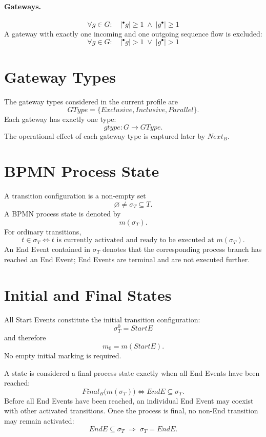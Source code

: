 \documentclass[11pt,a4paper]{article}
\newcommand{\StartE}{\mathit{StartE}}
\newcommand{\EndE}{\mathit{EndE}}
\newcommand{\NextB}{\mathit{Next}_{B}}
\newcommand{\GType}{\mathit{GType}}
\newcommand{\gtype}{\mathit{gtype}}
\begin{document}
\paragraph{Gateways.}
\[
\boxed{
\forall g\in G:\quad
|{}^{\bullet}g|\geq 1
\;\land\;
|g^{\bullet}|\geq 1
}
\tag{WF-G1}
\]
A gateway with exactly one incoming and one outgoing sequence flow is excluded:
\[
\boxed{
\forall g\in G:\quad
|{}^{\bullet}g|>1
\;\lor\;
|g^{\bullet}|>1
}
\tag{WF-G2}
\]

\section{Gateway Types}

The gateway types considered in the current profile are
\[
\boxed{
\GType=\{\mathit{Exclusive},\mathit{Inclusive},\mathit{Parallel}\}.
}
\]
Each gateway has exactly one type:
\[
\boxed{
\gtype:G\rightarrow\GType.
}
\]
The operational effect of each gateway type is captured later by $\NextB$.

\section{BPMN Process State}

A transition configuration is a non-empty set
\[
\boxed{\varnothing\neq\sigma_T\subseteq T.}
\]
A BPMN process state is denoted by
\[
\boxed{m(\sigma_T).}
\]
For ordinary transitions,
\[
\boxed{
t\in\sigma_T
\iff
t\text{ is currently activated and ready to be executed at }m(\sigma_T).
}
\]
An End Event contained in $\sigma_T$ denotes that the corresponding process branch has reached an End Event; End Events are terminal and are not executed further.

\section{Initial and Final States}

All Start Events constitute the initial transition configuration:
\[
\boxed{\sigma_T^{0}=\StartE}
\]
and therefore
\[
\boxed{m_0=m(\StartE).}
\]
No empty initial marking is required.

A state is considered a final process state exactly when all End Events have been reached:
\[
\boxed{
\mathit{Final}_B\bigl(m(\sigma_T)\bigr)
\iff
\EndE\subseteq\sigma_T.
}
\tag{FINAL}
\]
Before all End Events have been reached, an individual End Event may coexist with other activated transitions. Once the process is final, no non-End transition may remain activated:
\[
\boxed{
\EndE\subseteq\sigma_T
\;\Rightarrow\;
\sigma_T=\EndE.
}
\tag{WF-FINAL}
\]
\end{document}
